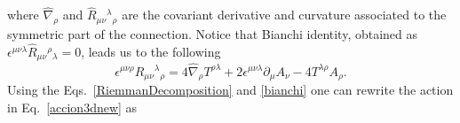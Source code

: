 \documentclass[%
  showpacs,showkeys,prd,superscriptaddress]{revtex4-1}
\begin{document}
where $ \hat\nabla_\rho$ and $\hat{R}_{\mu\nu}{}^\lambda{}_\rho$ are the covariant derivative and  curvature associated to the symmetric part of the connection.
Notice that Bianchi identity, obtained as $\epsilon^{\mu\nu\lambda}\hat R_{\mu\nu}{}^\rho{}_\lambda=0$, leads us to the following
\begin{equation}
 \label{bianchi}
 \epsilon^{\mu\nu\rho} R_{\mu\nu}{}^\lambda{}_\rho = 4\hat\nabla_\rho T^{\rho\lambda}
+2\epsilon^{\mu\nu\lambda}\partial_\mu A_\nu-4T^{\lambda\rho}A_\rho. 
\end{equation}
Using the  Eqs.~\eqref{RiemmanDecomposition} and \eqref{bianchi} one can rewrite the action in Eq.~\eqref{accion3dnew} as
\end{document}
